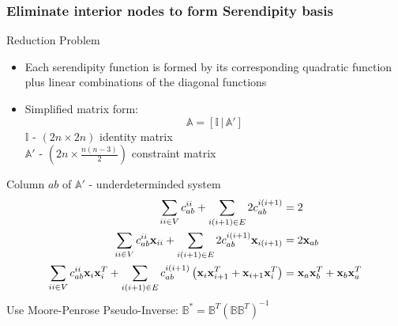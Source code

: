 \documentclass[compress,10pt]{beamer}
\renewcommand{\vec}[1]{\mathbf{#1}}
\begin{document}
\begin{frame}[t]\frametitle{Eliminate interior nodes to form Serendipity basis}
{\small
\vspace{-3mm}
\begin{block}{Reduction Problem}
\begin{itemize}
\item Each serendipity function is formed by its corresponding quadratic function plus linear combinations of the diagonal functions
\item Simplified matrix form:
\begin{equation*}
\mathbb{A} = \left[  \mathbb{I} \, | \, \mathbb{A}' \right]
\end{equation*}
$\mathbb{I}$ - $(2n \times 2n)$ identity matrix \\
$\mathbb{A}'$ - $(2n \times \frac{n(n-3)}{2})$ constraint matrix
\end{itemize}
\end{block}
\vspace{-3mm}
{
\begin{block}{Column $ab$ of $\mathbb{A}'$ - underdeterminded system}
\begin{equation*}
\begin{aligned}
\sum\displaylimits_{ii \in V} c_{ab}^{ii} + \sum\displaylimits_{i(i+1) \in E} 2 c_{ab}^{i(i+1)} &= 2 \\
\sum\displaylimits_{ii \in V} c_{ab}^{ii} \vec{x}_{ii} + \sum\displaylimits_{i(i+1) \in E} 2 c_{ab}^{i(i+1)} \vec{x}_{i (i+1)} &= 2 \vec{x}_{ab}\\
\sum\displaylimits_{ii \in V} c_{ab}^{ii} \vec{x}_{i} \vec{x}_{i}^T + \sum\displaylimits_{i(i+1) \in E} c_{ab}^{i(i+1)} \left(  \vec{x}_{i} \vec{x}_{i+1}^T + \vec{x}_{i+1} \vec{x}_{i}^T  \right) &= \vec{x}_{a} \vec{x}_{b}^T + \vec{x}_{b} \vec{x}_{a}^T
\end{aligned}
\end{equation*}
\vspace{2mm}
Use Moore-Penrose Pseudo-Inverse: $\mathbb{B}^* = \mathbb{B}^T (\mathbb{B} \mathbb{B}^T)^{-1}$
\end{block}
}
}
\end{frame}
\end{document}

